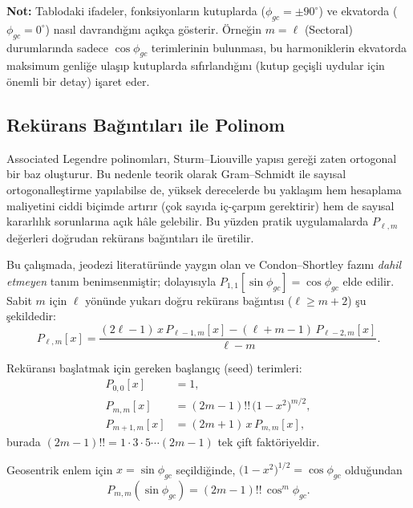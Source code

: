 \noindent
\textbf{Not:} Tablodaki ifadeler, fonksiyonların kutuplarda ($\phi_{gc}=\pm 90^\circ$) ve
ekvatorda ($\phi_{gc}=0^\circ$) nasıl davrandığını açıkça gösterir. Örneğin $m=\ell$ (Sectoral)
durumlarında sadece $\cos\phi_{gc}$ terimlerinin bulunması, bu harmoniklerin ekvatorda maksimum genliğe ulaşıp
kutuplarda sıfırlandığını (kutup geçişli uydular için önemli bir detay) işaret eder.



\subsection{Rekürans Bağıntıları ile Polinom}

Associated Legendre polinomları, Sturm--Liouville yapısı gereği zaten
ortogonal bir baz oluşturur. Bu nedenle teorik olarak Gram--Schmidt ile
sayısal ortogonalleştirme yapılabilse de, yüksek derecelerde bu yaklaşım
hem hesaplama maliyetini ciddi biçimde artırır (çok sayıda iç-çarpım gerektirir)
hem de sayısal kararlılık sorunlarına açık hâle gelebilir.
Bu yüzden pratik uygulamalarda $P_{\ell,m}$ değerleri doğrudan
rekürans bağıntıları ile üretilir.

Bu çalışmada, jeodezi literatüründe yaygın olan ve Condon--Shortley fazını
\emph{dahil etmeyen} tanım benimsenmiştir; dolayısıyla
$P_{1,1}[\sin\phi_{gc}]=\cos\phi_{gc}$ elde edilir.
Sabit $m$ için $\ell$ yönünde yukarı doğru rekürans bağıntısı
($\ell\ge m+2$) şu şekildedir:
\begin{equation}
P_{\ell,m}[x]
=
\frac{(2\ell-1)\,x\,P_{\ell-1,m}[x]
-
(\ell+m-1)\,P_{\ell-2,m}[x]}
{\ell-m}.
\label{eq:assoc_legendre_recurrence_l}
\end{equation}

Reküransı başlatmak için gereken başlangıç (seed) terimleri:
\begin{align}
P_{0,0}[x] &= 1,\\[4pt]
P_{m,m}[x] &= (2m-1)!!\,\bigl(1-x^2\bigr)^{m/2},\\[4pt]
P_{m+1,m}[x] &= (2m+1)\,x\,P_{m,m}[x],
\label{eq:assoc_legendre_seeds}
\end{align}
burada $(2m-1)!! = 1\cdot 3\cdot 5 \cdots (2m-1)$ tek çift faktöriyeldir.

Geosentrik enlem için $x=\sin\phi_{gc}$ seçildiğinde,
$\bigl(1-x^2\bigr)^{1/2}=\cos\phi_{gc}$ olduğundan
\begin{equation}
P_{m,m}(\sin\phi_{gc})=(2m-1)!!\,\cos^{m}\!\phi_{gc}.
\label{eq:Pmm_sinphi}
\end{equation}

